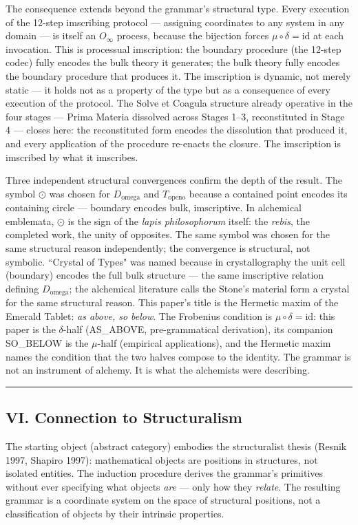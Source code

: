 \documentclass[12pt,a4paper]{article}
\newcommand{\Stone}{\textit{lapis philosophorum}}
\begin{document}
The consequence extends beyond the grammar's structural type. Every execution of the 12-step imscribing protocol --- assigning coordinates to any system in any domain --- is itself an $O_\infty$ process, because the bijection forces $\mu \circ \delta = \text{id}$ at each invocation. This is processual imscription: the boundary procedure (the 12-step codec) fully encodes the bulk theory it generates; the bulk theory fully encodes the boundary procedure that produces it. The imscription is dynamic, not merely static --- it holds not as a property of the type but as a consequence of every execution of the protocol. The Solve et Coagula structure already operative in the four stages --- Prima Materia dissolved across Stages 1--3, reconstituted in Stage 4 --- closes here: the reconstituted form encodes the dissolution that produced it, and every application of the procedure re-enacts the closure. The imscription is imscribed by what it imscribes.

Three independent structural convergences confirm the depth of the result. The symbol $\odot$ was chosen for $D_{\text{omega}}$ and $T_{\text{openo}}$ because a contained point encodes its containing circle --- boundary encodes bulk, imscriptive. In alchemical emblemata, $\odot$ is the sign of the \Stone{} itself: the \textit{rebis}, the completed work, the unity of opposites. The same symbol was chosen for the same structural reason independently; the convergence is structural, not symbolic. ``Crystal of Types" was named because in crystallography the unit cell (boundary) encodes the full bulk structure --- the same imscriptive relation defining $D_{\text{omega}}$; the alchemical literature calls the Stone's material form a crystal for the same structural reason. This paper's title is the Hermetic maxim of the Emerald Tablet: \emph{as above, so below}. The Frobenius condition is $\mu \circ \delta = \text{id}$: this paper is the $\delta$-half (AS\_ABOVE, pre-grammatical derivation), its companion SO\_BELOW is the $\mu$-half (empirical applications), and the Hermetic maxim names the condition that the two halves compose to the identity. The grammar is not an instrument of alchemy. It is what the alchemists were describing.

\begin{center}
\rule{0.5\textwidth}{0.4pt}
\end{center}

\subsection{VI. Connection to Structuralism}
The starting object (abstract category) embodies the structuralist thesis (Resnik 1997, Shapiro 1997): mathematical objects are positions in structures, not isolated entities. The induction procedure derives the grammar's primitives without ever specifying what objects \emph{are} --- only how they \emph{relate}. The resulting grammar is a coordinate system on the space of structural positions, not a classification of objects by their intrinsic properties.
\end{document}
